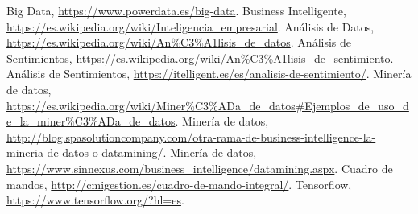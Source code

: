 \documentclass{article}
\begin{document}
\begin{thebibliography}{9}
Big Data, 
\url{https://www.powerdata.es/big-data}.
Business Intelligente, 
\url{https://es.wikipedia.org/wiki/Inteligencia_empresarial}.
Análisis de Datos, 
\url{https://es.wikipedia.org/wiki/An\%C3\%A1lisis_de_datos}.
Análisis de Sentimientos, 
\url{https://es.wikipedia.org/wiki/An\%C3\%A1lisis_de_sentimiento}.
Análisis de Sentimientos, 
\url{https://itelligent.es/es/analisis-de-sentimiento/}.
Minería de datos, 
\url{https://es.wikipedia.org/wiki/Miner\%C3\%ADa_de_datos#Ejemplos_de_uso_de_la_miner\%C3\%ADa_de_datos}.
Minería de datos, 
\url{http://blog.spasolutioncompany.com/otra-rama-de-business-intelligence-la-mineria-de-datos-o-datamining/}.
Minería de datos, 
\url{https://www.sinnexus.com/business_intelligence/datamining.aspx}.
Cuadro de mandos, 
\url{http://cmigestion.es/cuadro-de-mando-integral/}.
Tensorflow, 
\url{https://www.tensorflow.org/?hl=es}.
\end{thebibliography}
\end{document}
